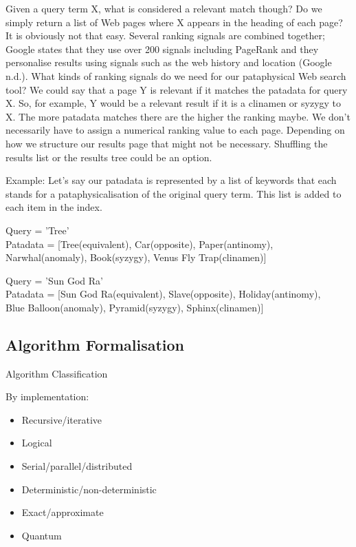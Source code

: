 Given a query term X, what is considered a relevant match though? Do we simply return a list of Web pages where X appears in the heading of each page? It is obviously not that easy. Several ranking signals are combined together; Google states that they use over 200 signals including PageRank and they personalise results using signals such as the web history and location (Google n.d.).
What kinds of ranking signals do we need for our pataphysical Web search tool? We could say that a page Y is relevant if it matches the patadata for query X. So, for example, Y would be a relevant result if it is a clinamen or syzygy to X. The more patadata matches there are the higher the ranking maybe. We don't necessarily have to assign a numerical ranking value to each page. Depending on how we structure our results page that might not be necessary. Shuffling the results list or the results tree could be an option.

Example: Let's say our patadata is represented by a list of keywords that each stands for a pataphysicalisation of the original query term. This list is added to each item in the index.

Query      = 'Tree'\\
Patadata = [Tree(equivalent),  Car(opposite), Paper(antinomy),\\ Narwhal(anomaly), Book(syzygy), Venus Fly Trap(clinamen)]

Query      = 'Sun God Ra'\\
Patadata = [Sun God Ra(equivalent),  Slave(opposite), Holiday(antinomy),\\ Blue Balloon(anomaly), Pyramid(syzygy), Sphinx(clinamen)]

\subsection{Algorithm Formalisation}

Algorithm Classification

By implementation:
\begin{itemize}
  \item Recursive/iterative
  \item Logical
  \item Serial/parallel/distributed
  \item Deterministic/non-deterministic
  \item Exact/approximate
  \item Quantum
\end{itemize}


